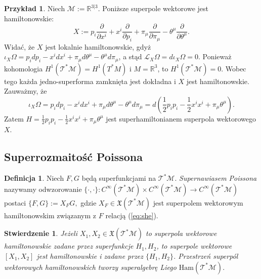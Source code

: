 \documentclass[11pt,a4paper]{report}
\newtheorem{proposition}[theorem]{Stwierdzenie}
\theoremstyle{definition}
\newtheorem{example}[theorem]{Przykład}
\newtheorem{definition}[theorem]{Definicja}
\begin{document}
\begin{example}
	Niech $\mathcal{M}:= \mathbb{R}^{3|3}$. Poniższe superpole wektorowe jest hamiltonowskie:
	\begin{equation*}
		X := p_i \frac{\partial}{\partial x^i} + x^i \frac{\partial}{\partial p_i} + \pi_\mu \frac{\partial}{\partial \pi_\mu} - \theta^\mu \frac{\partial}{\partial \theta^\mu}.
	\end{equation*}
	Widać, że $X$ jest lokalnie hamiltonowskie, gdyż $\iota_X \Omega = p_i dp_i - x^i dx^i + \pi_\mu d\theta^\mu - \theta^\mu d\pi_\mu$, a stąd $\mathcal{L}_X \Omega = d \iota_X \Omega = 0$. Ponieważ kohomologia $H^1(\mathcal{T^*M}) = H^1(T^*M)$ i $M=\mathbb{R}^3$, to $H^1(\mathcal{T^*M}) = 0$. Wobec tego każda jedno-superforma zamknięta jest dokładna i $X$ jest hamiltonowskie. Zauważmy, że
	\begin{equation*}
		\iota_X \Omega = p_i dp_i - x^i dx^i + \pi_\mu d\theta^\mu - \theta^\mu d\pi_\mu = d \left( \frac12 p_i p_i - \frac12 x^i x^i + \pi_\mu \theta^\mu \right).
	\end{equation*}
	Zatem $H = \frac12 p_i p_i - \frac12 x^i x^i + \pi_\mu \theta^\mu$ jest superhamiltonianem superpola wektorowego $X$.
\end{example}
			      				
\subsection{Superrozmaitość Poissona}
			      				
\begin{definition}
	Niech $F,G$ będą superfunkcjami na $\mathcal{T^*M}$. \textit{Supernawiasem Poissona} nazywamy odwzorowanie $\{\cdot, \cdot\}: C^\infty (\mathcal{T^*M}) \times C^\infty (\mathcal{T^*M}) \rightarrow C^\infty(\mathcal{T^*M})$ postaci $\{F, G \} :=X_F G,$ gdzie $X_F \in \mathfrak{X}(\mathcal{T^*M})$ jest superpolem wektorowym hamiltonowskim związanym z $F$ relacją (\ref{eq:she}).
\end{definition}
			      				
\begin{proposition}
	Jeżeli $X_1, X_2 \in \mathfrak{X}(\mathcal{T^*M})$ to superpola wektorowe hamiltonowskie zadane przez superfunkcje $H_1, H_2$, to superpole wektorowe $[X_1, X_2]$ jest hamiltonowskie i zadane przez $\{H_1, H_2\}$. Przestrzeń superpól wektorowych hamiltonowskich tworzy superalgebrę Liego $\mathrm{Ham}(\mathcal{T^*M}).$
\end{proposition}
			      				
\end{document}
